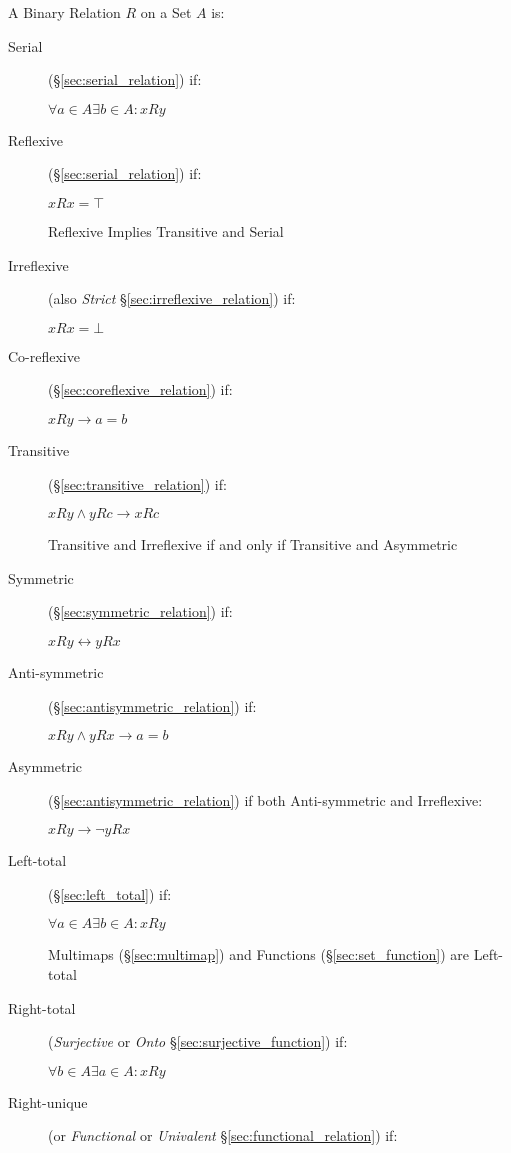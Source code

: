A Binary Relation $R$ on a Set $A$ is:
\begin{description}
\item[Serial](\S\ref{sec:serial_relation}) if:

  $ \forall a \in A \exists b \in A : xRy $

\item[Reflexive](\S\ref{sec:serial_relation}) if:

  $ xRx = \top $

  Reflexive Implies Transitive and Serial

\item[Irreflexive] (also \emph{Strict}
  \S\ref{sec:irreflexive_relation}) if:

  $ xRx = \bot $

\item[Co-reflexive](\S\ref{sec:coreflexive_relation}) if:

  $ xRy \to a = b $

\item[Transitive](\S\ref{sec:transitive_relation}) if:

  $ xRy \wedge yRc \to xRc $

  Transitive and Irreflexive if and only if Transitive and Asymmetric

\item[Symmetric](\S\ref{sec:symmetric_relation}) if:

  $ xRy \leftrightarrow yRx $

\item[Anti-symmetric](\S\ref{sec:antisymmetric_relation}) if:

  $ xRy \wedge yRx \to a = b $

\item[Asymmetric](\S\ref{sec:antisymmetric_relation}) if both
  Anti-symmetric and Irreflexive:

  $ xRy \to \neg yRx $

\item[Left-total] (\S\ref{sec:left_total}) if:

  $ \forall a \in A \exists b \in A : xRy $

  Multimaps (\S\ref{sec:multimap}) and Functions
  (\S\ref{sec:set_function}) are Left-total

\item[Right-total] (\emph{Surjective} or \emph{Onto}
  \S\ref{sec:surjective_function}) if:

  $ \forall b \in A \exists a \in A : xRy $

\item[Right-unique] (or \emph{Functional} or \emph{Univalent}
  \S\ref{sec:functional_relation}) if:


\end{description}

